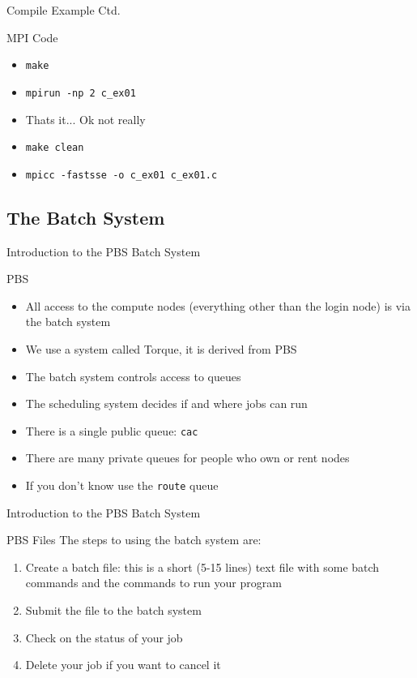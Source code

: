 \documentclass{beamer}
\begin{document}
\begin{frame}{Compile Example Ctd.}
 \begin{block}{MPI Code}
  \begin{itemize}
   \item \texttt{make}
   \item \texttt{mpirun -np 2 c\_ex01}
   \item <2-> Thats it...  Ok not really
   \item <3-> \texttt{make clean}
   \item <3-> \texttt{mpicc -fastsse -o c\_ex01 c\_ex01.c}
  \end{itemize}
 \end{block}
\end{frame}



  \subsection{The Batch System}
  \begin{frame}{Introduction to the PBS Batch System}
   \begin{block}{PBS}
    \begin{itemize}
    \item All access to the compute nodes (everything other than the login node)
      is via the batch system
    \item We use a system called Torque, it is derived from PBS
    \item The batch system controls access to queues
    \item The scheduling system decides if and where jobs can run
    \item<2-> There is a single public queue: \texttt{cac}
    \item<2-> There are many private queues for people who own or rent nodes
    \item<2-> If you don't know use the \texttt{route} queue
    \end{itemize}
   \end{block}
  \end{frame}
  \begin{frame}{Introduction to the PBS Batch System}
   \begin{block}{PBS Files}
    The steps to using the batch system are:
    \begin{enumerate}
    \item Create a batch file: this is a short (5-15 lines) text file with some
      batch commands and the commands to run your program
    \item Submit the file to the batch system
    \item Check on the status of your job
    \item Delete your job if you want to cancel it
    \end{enumerate}
   \end{block}
  \end{frame}
\end{document}
